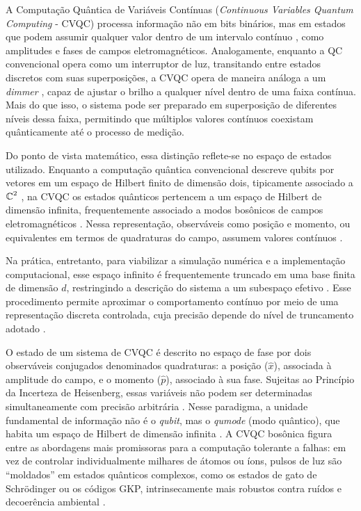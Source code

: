 A Computação Quântica de Variáveis Contínuas (\textit{Continuous Variables Quantum Computing} - CVQC) processa informação não em bits binários, mas em estados que podem assumir qualquer valor dentro de um intervalo contínuo \cite{braunstein2005quantum}, como amplitudes e fases de campos eletromagnéticos. Analogamente, enquanto a QC convencional opera como um interruptor de luz, transitando entre estados discretos com suas superposições, a CVQC opera de maneira análoga a um \textit{dimmer} \cite{lloyd1999quantum}, capaz de ajustar o brilho a qualquer nível dentro de uma faixa contínua. Mais do que isso, o sistema pode ser preparado em superposição de diferentes níveis dessa faixa, permitindo que múltiplos valores contínuos coexistam quânticamente até o processo de medição.

Do ponto de vista matemático, essa distinção reflete-se no espaço de estados utilizado. Enquanto a computação quântica convencional descreve qubits por vetores em um espaço de Hilbert finito de dimensão dois, tipicamente associado a $\operatorname{\mathbb{C}}^2$ \cite{nielsen_quantum_2002}, na CVQC os estados quânticos pertencem a um espaço de Hilbert de dimensão infinita, frequentemente associado a modos bosônicos de campos eletromagnéticos \cite{braunstein2005quantum}. Nessa representação, observáveis como posição e momento, ou equivalentes em termos de quadraturas do campo, assumem valores contínuos \cite{lloyd1999quantum,o2007optical}.

Na prática, entretanto, para viabilizar a simulação numérica e a implementação computacional, esse espaço infinito é frequentemente truncado em uma base finita de dimensão $d$, restringindo a descrição do sistema a um subespaço efetivo \cite{johansson2012qutip}. Esse procedimento permite aproximar o comportamento contínuo por meio de uma representação discreta controlada, cuja precisão depende do nível de truncamento adotado \cite{ripoll2022quantum}.

O estado de um sistema de CVQC é descrito no espaço de fase por dois observáveis conjugados denominados quadraturas: a posição ($\hat{x}$), associada à amplitude do campo, e o momento ($\hat{p}$), associado à sua fase. Sujeitas ao Princípio da Incerteza de Heisenberg, essas variáveis não podem ser determinadas simultaneamente com precisão arbitrária \cite{serafini_quantum_2023, weedbrook2012gaussian}. Nesse paradigma, a unidade fundamental de informação não é o \textit{qubit}, mas o \textit{qumode} (modo quântico), que habita um espaço de Hilbert de dimensão infinita \cite{lloyd1999quantum}. A CVQC bosônica figura entre as abordagens mais promissoras para a computação tolerante a falhas: em vez de controlar individualmente milhares de átomos ou íons, pulsos de luz são ``moldados'' em estados quânticos complexos, como os estados de gato de Schrödinger ou os códigos GKP, intrinsecamente mais robustos contra ruídos e decoerência ambiental \cite{gottesman2000encoding, bourassa2021blueprint}.

